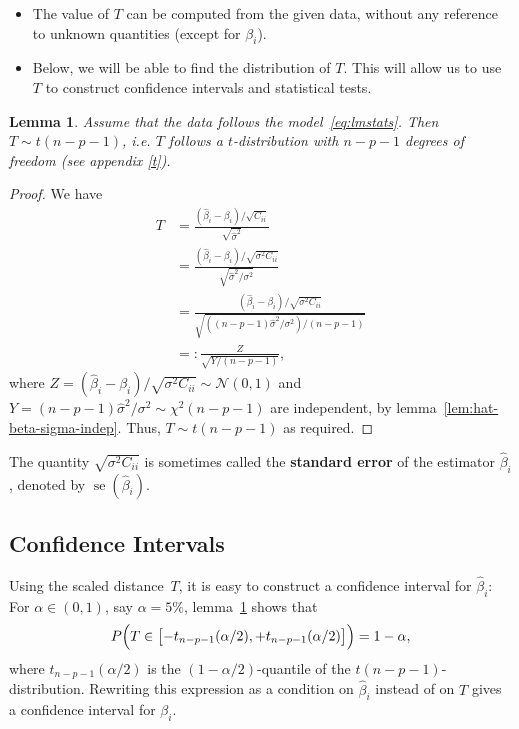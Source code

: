 \documentclass[
  a4paper,
]{article}
\newtheorem{lemma}{Lemma}[section]
\theoremstyle{definition}
\theoremstyle{definition}
\theoremstyle{definition}
\theoremstyle{definition}
\theoremstyle{remark}
\begin{document}
\begin{itemize}
\item
  The value of \(T\) can be computed from the given data, without
  any reference to unknown quantities (except for \(\beta_i\)).
\item
  Below, we will be able to find the distribution of \(T\). This will
  allow us to use \(T\) to construct confidence intervals and statistical
  tests.
\end{itemize}

\begin{lemma}
\protect\hypertarget{lem:beta-i-follows-t}{}\label{lem:beta-i-follows-t}Assume that the data follows the model~\eqref{eq:lmstats}.
Then \(T \sim t(n-p-1)\), \emph{i.e.} \(T\) follows a
\(t\)-distribution with \(n-p-1\) degrees of freedom (see appendix \ref{t}).
\end{lemma}

\begin{proof}
We have
\begin{align*}
  T
  &= \frac{(\hat\beta_i - \beta_i) / \sqrt{C_{ii}}}
      {\sqrt{\hat\sigma^2}} \\
  &= \frac{(\hat\beta_i - \beta_i) / \sqrt{\sigma^2 C_{ii}}}
      {\sqrt{\hat\sigma^2 / \sigma^2}} \\
  &= \frac{(\hat\beta_i - \beta_i) / \sqrt{\sigma^2 C_{ii}}}
      {\sqrt{((n - p - 1) \hat\sigma^2 / \sigma^2) / (n - p -1)}} \\
  &=: \frac{Z}{\sqrt{Y / (n - p - 1)}},
\end{align*}
where \(Z = (\hat\beta_i - \beta_i) / \sqrt{\sigma^2 C_{ii}} \sim \mathcal{N}(0,1)\)
and \(Y = (n - p - 1) \hat\sigma^2/\sigma^2 \sim \chi^2(n-p-1)\)
are independent, by lemma~\ref{lem:hat-beta-sigma-indep}.
Thus, \(T \sim t(n-p-1)\) as required.
\end{proof}

The quantity \(\sqrt{\sigma^2 C_{ii}}\) is sometimes called the
\textbf{standard error} of the estimator \(\hat\beta_i\), denoted by
\(\mathop{\mathrm{se}}(\hat\beta_i)\).

\hypertarget{confidence-intervals}{%
\subsection{Confidence Intervals}\label{confidence-intervals}}

Using the scaled distance~\(T\), it is easy to construct a confidence
interval for \(\hat\beta_i\): For \(\alpha \in (0, 1)\), say \(\alpha = 5\%\),
lemma~\ref{lem:beta-i-follows-t} shows that
\begin{equation*}
  P\Bigl( T \in \bigl[-t_{n-p-1}(\alpha/2), +t_{n-p-1}(\alpha/2)\bigr] \Bigr)
  = 1 - \alpha,
\end{equation*}
where \(t_{n-p-1}(\alpha/2)\) is the \((1 - \alpha/2)\)-quantile of the
\(t(n-p-1)\)-distribution. Rewriting this expression as a condition on
\(\hat\beta_i\) instead of on \(T\) gives a confidence interval for \(\beta_i\).
\end{document}
